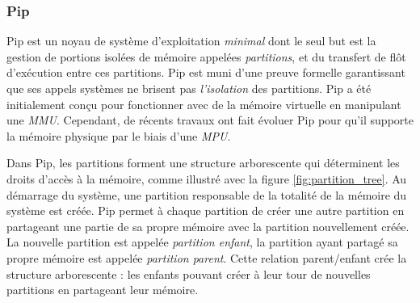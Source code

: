 			\subsubsection{Pip}
	\label{sec:pip}

	Pip est un noyau de système d'exploitation \emph{minimal} dont le seul but est la gestion de portions isolées de mémoire appelées \emph{partitions}, et du transfert de flôt d'exécution entre ces partitions. Pip est muni d'une preuve formelle garantissant que ses appels systèmes ne brisent pas \emph{l'isolation} des partitions. Pip a été initialement conçu pour fonctionner avec de la mémoire virtuelle en manipulant une \emph{MMU}. Cependant, de récents travaux ont fait évoluer Pip pour qu'il supporte la mémoire physique par le biais d'une \emph{MPU}.

	Dans Pip, les partitions forment une structure arborescente qui déterminent les droits d'accès à la mémoire, comme illustré avec la figure \ref{fig:partition_tree}. Au démarrage du système, une partition responsable de la totalité de la mémoire du système est créée. Pip permet à chaque partition de créer une autre partition en partageant une partie de sa propre mémoire avec la partition nouvellement créée. La nouvelle partition est appelée \emph{partition enfant}, la partition ayant partagé sa propre mémoire est appelée \emph{partition parent}. Cette relation parent/enfant crée la structure arborescente : les enfants pouvant créer à leur tour de nouvelles partitions en partageant leur mémoire.

	\begin{figure}[!ht]
	\end{figure}

	

